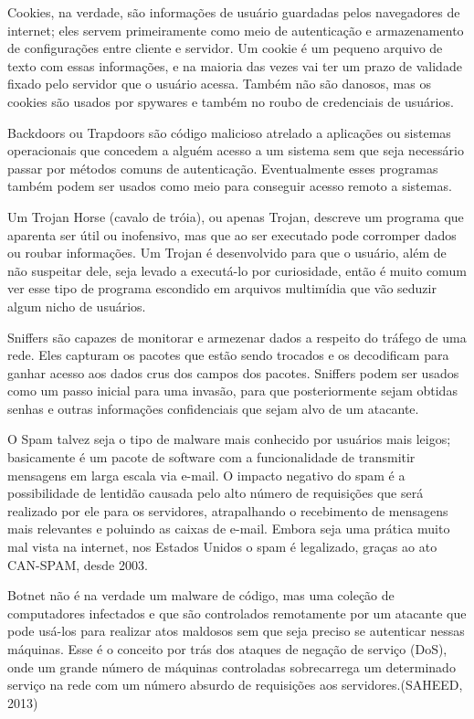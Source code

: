 Cookies, na verdade, são informações de usuário guardadas pelos navegadores de
internet; eles servem primeiramente como meio de autenticação e armazenamento
de configurações entre cliente e servidor. Um cookie é um pequeno arquivo de
texto com essas informações, e na maioria das vezes vai ter um prazo de
validade fixado pelo servidor que o usuário acessa. Também não são danosos,
mas os cookies são usados por spywares e também no roubo de credenciais de
usuários.

Backdoors ou Trapdoors são código malicioso atrelado a aplicações ou sistemas
operacionais que concedem a alguém acesso a um sistema sem que seja necessário
passar por métodos comuns de autenticação. Eventualmente esses programas
também podem ser usados como meio para conseguir acesso remoto a sistemas.

Um Trojan Horse (cavalo de tróia), ou apenas Trojan, descreve um programa que
aparenta ser útil ou inofensivo, mas que ao ser executado pode corromper dados
ou roubar informações. Um Trojan é desenvolvido para que o usuário, além de
não suspeitar dele, seja levado a executá-lo por curiosidade, então é muito
comum ver esse tipo de programa escondido em arquivos multimídia que vão
seduzir algum nicho de usuários.

Sniffers são capazes de monitorar e armezenar dados a respeito do tráfego de
uma rede. Eles capturam os pacotes que estão sendo trocados e os decodificam
para ganhar acesso aos dados crus dos campos dos pacotes. Sniffers podem ser
usados como um passo inicial para uma invasão, para que posteriormente sejam
obtidas senhas e outras informações confidenciais que sejam alvo de um
atacante.

O Spam talvez seja o tipo de malware mais conhecido por usuários mais leigos;
basicamente é um pacote de software com a funcionalidade de transmitir
mensagens em larga escala via e-mail. O impacto negativo do spam é a
possibilidade de lentidão causada pelo alto número de requisições que será
realizado por ele para os servidores, atrapalhando o recebimento de mensagens
mais relevantes e poluindo as caixas de e-mail. Embora seja uma prática muito
mal vista na internet, nos Estados Unidos o spam é legalizado, graças ao ato
CAN-SPAM, desde 2003.

Botnet não é na verdade um malware de código, mas uma coleção de computadores
infectados e que são controlados remotamente por um atacante que pode usá-los
para realizar atos maldosos sem que seja preciso se autenticar nessas
máquinas. Esse é o conceito por trás dos ataques de negação de serviço (DoS),
onde um grande número de máquinas controladas sobrecarrega um determinado
serviço na rede com um número absurdo de requisições aos servidores.(SAHEED, 2013)

